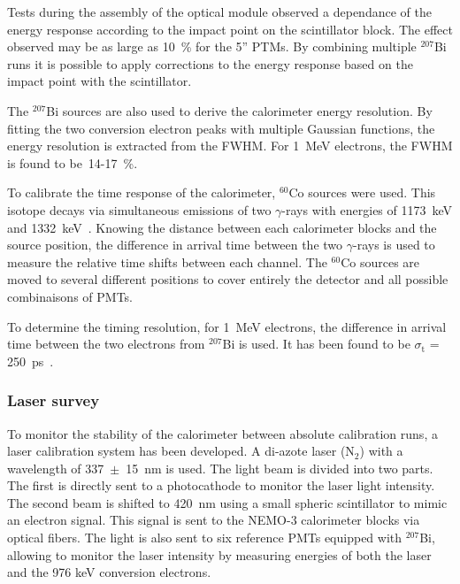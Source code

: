\documentclass[main.tex]{subfiles}
\begin{document}
\bigskip


\NI Tests during the assembly of the optical module observed a dependance of the energy response according to the impact point on the scintillator block. The effect observed may be as large as 10~\% for the 5'' PTMs. By combining multiple $^{\text{207}}$Bi runs it is possible to apply corrections to the energy response based on the impact point with the scintillator.


\bigskip


\NI The $^{\text{207}}$Bi sources are also used to derive the calorimeter energy resolution. By fitting the two conversion electron peaks with multiple Gaussian functions, the energy resolution is extracted from the FWHM. For 1~MeV electrons, the FWHM is found to be~14-17~\%. 
 
 
\bigskip


\NI To calibrate the time response of the calorimeter, $^{\text{60}}$Co sources were used. This isotope decays via simultaneous emissions of two $\gamma$-rays with energies of 1173~keV and 1332~keV~\cite{DecayCo60}. Knowing the distance between each calorimeter blocks and the source position, the difference in arrival time between the two $\gamma$-rays is used to measure the relative time shifts between each channel. The $^{\text{60}}$Co sources are moved to several different positions to cover entirely the detector and all possible combinaisons of PMTs.


\bigskip


\NI To determine the timing resolution, for 1~MeV electrons, the difference in arrival time between the two electrons from $^{\text{207}}$Bi is used. It has been found to be $\sigma_{\text{t}}$ = 250~ps~\cite{NEMO-3-detector}.

 
\subsubsection{Laser survey}


\NI To monitor the stability of the calorimeter between absolute calibration runs, a laser calibration system has been developed. A di-azote laser (N$_\text{2}$) with a wavelength of 337~$\pm$~15~nm is used. The light beam is divided into two parts. The first is directly sent to a photocathode to monitor the laser light intensity. The second beam is shifted to 420~nm using a small spheric scintillator to mimic an electron signal. This signal is sent to the NEMO-3 calorimeter blocks via optical fibers. The light is also sent to six reference PMTs equipped with $^{\text{207}}$Bi, allowing to monitor the laser intensity by measuring energies of both the laser and the 976 keV conversion electrons.
\end{document}

